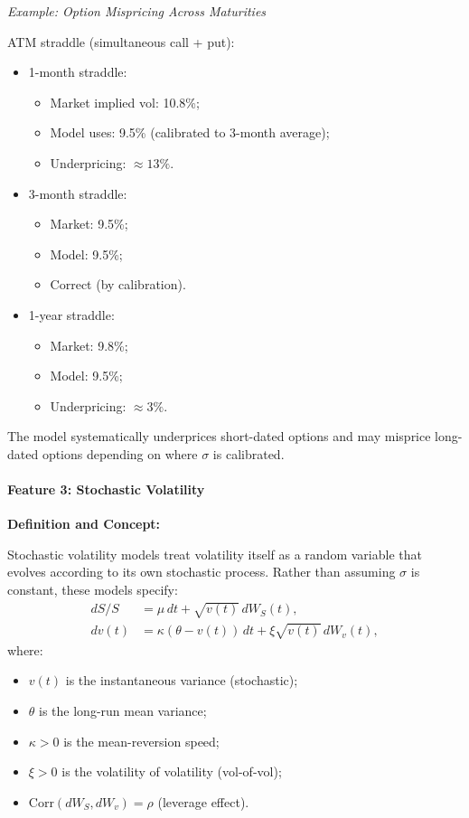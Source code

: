 \textit{Example: Option Mispricing Across Maturities}

ATM straddle (simultaneous call + put):
\begin{itemize}
	\item 1-month straddle:
	\begin{itemize}
		\item Market implied vol: 10.8\%;
		\item Model uses: 9.5\% (calibrated to 3-month average);
		\item Underpricing: $\approx 13\%$.
	\end{itemize}
	
	\item 3-month straddle:
	\begin{itemize}
		\item Market: 9.5\%;
		\item Model: 9.5\%;
		\item Correct (by calibration).
	\end{itemize}
	
	\item 1-year straddle:
	\begin{itemize}
		\item Market: 9.8\%;
		\item Model: 9.5\%;
		\item Underpricing: $\approx 3\%$.
	\end{itemize}
\end{itemize}

The model systematically underprices short-dated options and may misprice long-dated options depending on where $\sigma$ is calibrated.

\paragraph{Feature 3: Stochastic Volatility}

\textbf{Definition and Concept:}

Stochastic volatility models treat volatility itself as a random variable that evolves according to its own stochastic process. Rather than assuming $\sigma$ is constant, these models specify:
\begin{align}
	dS/S &= \mu \, dt + \sqrt{v(t)} \, dW_S(t), \\
	dv(t) &= \kappa(\theta - v(t)) \, dt + \xi \sqrt{v(t)} \, dW_v(t),
\end{align}
where:
\begin{itemize}
	\item $v(t)$ is the instantaneous variance (stochastic);
	\item $\theta$ is the long-run mean variance;
	\item $\kappa > 0$ is the mean-reversion speed;
	\item $\xi > 0$ is the volatility of volatility (vol-of-vol);
	\item $\text{Corr}(dW_S, dW_v) = \rho$ (leverage effect).
\end{itemize}

